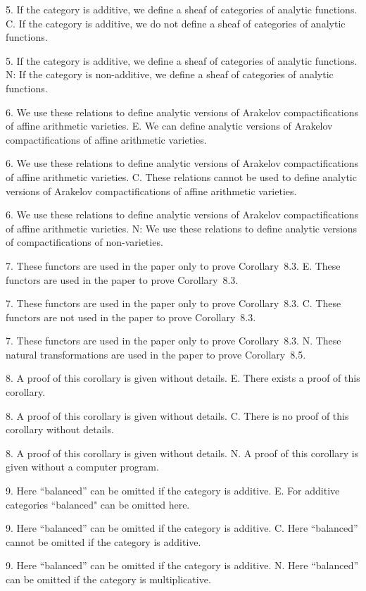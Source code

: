 5. If the category is additive, we define a sheaf of categories of analytic functions.
C. If the category is additive, we do not define a sheaf of categories of analytic functions.

5. If the category is additive, we define a sheaf of categories of analytic functions.
N: If the category is non-additive, we define a sheaf of categories of analytic functions.

6. We use these relations to define analytic versions of Arakelov compactifications of affine arithmetic varieties.
E. We can define analytic versions of Arakelov compactifications of affine arithmetic varieties.

6. We use these relations to define analytic versions of Arakelov compactifications of affine arithmetic varieties.
C. These relations cannot be used to define analytic versions of Arakelov compactifications of affine arithmetic varieties.

6. We use these relations to define analytic versions of Arakelov compactifications of affine arithmetic varieties.
N: We use these relations to define analytic versions of  compactifications of non-varieties.

7. These functors are used in the paper only to prove Corollary~8.3.
E. These functors are used in the paper  to prove Corollary~8.3.

7. These functors are used in the paper only to prove Corollary~8.3.
C. These functors are not used in the paper  to prove Corollary~8.3.

7. These functors are used in the paper only to prove Corollary~8.3.
N. These natural transformations are used in the paper  to prove Corollary~8.5.

8. A proof of this corollary is given without details.
E. There exists a proof of this corollary.

8. A proof of this corollary is given without details.
C. There is no proof of this corollary without details.

8. A proof of this corollary is given without details.
N. A proof of this corollary is given without a computer program.

9. Here ``balanced'' can be omitted if the category is additive.
E. For additive categories ``balanced" can be omitted here.

9. Here ``balanced'' can be omitted if the category is additive.
C. Here ``balanced'' cannot be omitted if the category is additive.

9. Here ``balanced'' can be omitted if the category is additive.
N. Here ``balanced'' can be omitted if the category is multiplicative.

